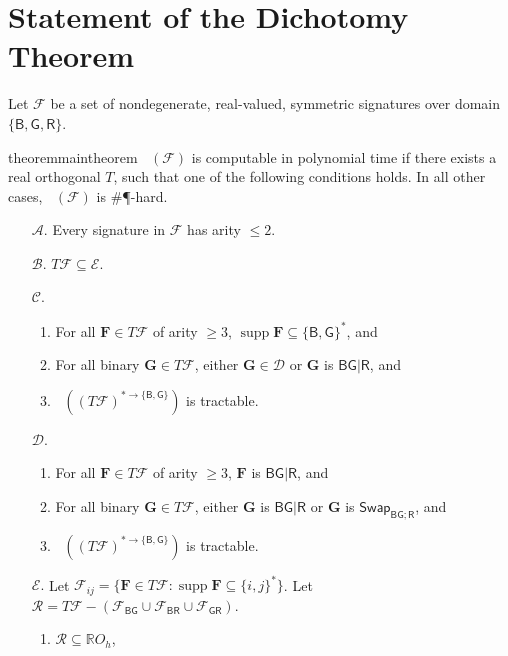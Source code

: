 \documentclass[11pt]{article}
\DeclareMathOperator{\holbs}{Holant^*_2}
\DeclareMathOperator{\holts}{Holant^*_3}
\DeclareMathOperator{\supp}{supp}
\newcommand{\db}{\mathsf{B}}
\newcommand{\dg}{\mathsf{G}}
\newcommand{\dr}{\mathsf{R}}
\newcommand{\swhelper}[1]{$\mathsf{Swap}_{#1}$\xspace}
\newcommand{\swbg}{\swhelper{\db \dg; \dr}}
\newcommand{\octgroup}{O_h}
\newcommand{\domres}[1]{
  ^{*\to\{#1\}}
}
\newcommand{\tractbinary}{$\mathscr{A}$\xspace}
\newcommand{\tractE}{$\mathscr{B}$\xspace}
\newcommand{\tractBG}{$\mathscr{C}$\xspace}
\newcommand{\tractBGR}{$\mathscr{D}$\xspace}
\newcommand{\tractBGGRBR}{$\mathscr{E}$\xspace}
\begin{document}
\section{Statement of the Dichotomy Theorem}
Let $\mathcal{F}$ be a set of nondegenerate, real-valued, symmetric signatures over domain $\{\db, \dg, \dr\}$.
\begin{restatable}{theorem}{maintheorem}\label{thm:dichotomy-set-of-domain-3}
$\holts(\mathcal{F})$ is computable in polynomial time if there exists a real orthogonal $T$, such that one of the following conditions holds.
  In all other cases, $\holts(\mathcal{F})$ is \#\P-hard.
  \begin{enumerate}
\item[\tractbinary.] \label{tract-binary} Every signature in $\mathcal{F}$ has arity $\le 2$.
    \item[\tractE.] \label{tract-E} $T \mathcal{F} \subseteq \mathcal{E}$.
    \item[\tractBG.] \label{tract-BG} 
\begin{enumerate}
        \item For all $\mathbf{F} \in T \mathcal{F}$ of arity $ \ge 3$, $\supp \mathbf{F} \subseteq \{\db, \dg\}^*$, and
        \item For all binary $\mathbf{G} \in T \mathcal{F}$, either $\mathbf{G} \in \mathcal{D}$ or $\mathbf{G}$ is $\db \dg | \dr$, and
\item $\holbs((T\mathcal{F})\domres{\db, \dg})$ is tractable.
      \end{enumerate}
    \item[\tractBGR.] \label{tract-BG-R} 
\begin{enumerate}
        \item For all $\mathbf{F} \in T \mathcal{F}$ of arity $ \ge 3$, $\mathbf{F}$ is $\db \dg | \dr$, and
        \item For all binary $\mathbf{G} \in T \mathcal{F}$, either $\mathbf{G}$ is $\db \dg | \dr$ or $\mathbf{G}$ is \swbg, and
        \item $\holbs((T\mathcal{F})\domres{\db, \dg})$ is tractable.
      \end{enumerate}
    \item[\tractBGGRBR.] \label{tract-BG-GR-BR} Let $\mathcal{F}_{ij} = \{\mathbf{F} \in T \mathcal{F} : \supp \mathbf{F} \subseteq \{i, j\}^*\}$.
      Let $\mathcal{R} = T \mathcal{F} - (\mathcal{F}_{\db \dg} \cup \mathcal{F}_{\db \dr} \cup \mathcal{F}_{\dg \dr})$. 
\begin{enumerate}
        \item $\mathcal{R} \subseteq \mathbb{R}\octgroup$,

\end{enumerate}
\end{enumerate}
\end{restatable}
\end{document}
